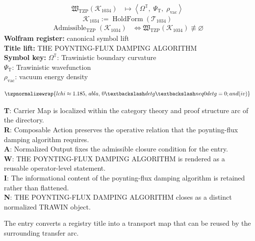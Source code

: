 \noindent
\begin{minipage}[t]{0.48\linewidth}
\begingroup
\small
\[
\begin{aligned}
\mathfrak{W}_{\mathrm{TZP}}\!\left(\mathcal{K}_{1034}\right)
&\longmapsto
\left\langle \Omega^{\mathbb{T}},\; \Psi_{\mathrm{T}},\; \rho_{\mathrm{vac}} \right\rangle
\end{aligned}
\]
\[
\mathcal{K}_{1034}
:=
\operatorname{HoldForm}\!\left(\mathcal{T}_{1034}\right)
\]
\[
\begin{aligned}
\operatorname{Admissible}_{\mathrm{TZP}}\!\left(\mathcal{K}_{1034}\right)
&\Longleftrightarrow
\mathfrak{W}_{\mathrm{TZP}}\!\left(\mathcal{K}_{1034}\right)\not\equiv\varnothing
\end{aligned}
\]
\textbf{Wolfram register:} canonical symbol lift\\
\textbf{Title lift:} THE POYNTING-FLUX DAMPING ALGORITHM\\
\textbf{Symbol key:} \(\Omega^{\mathbb{T}}\): Trawinistic boundary curvature\\ \(\Psi_{\mathrm{T}}\): Trawinistic wavefunction\\ \(\rho_{\mathrm{vac}}\): vacuum energy density
\par
\endgroup
\end{minipage}\hfill
\begin{minipage}[t]{0.48\linewidth}
\[
\tzpnormalizewrap{lchi\approx1.185,\,abla,\,0\textbackslash det g\textbackslash neq 0detg=0; and (iv)}
\]

\small
\textbf{T}: Carrier Map is localized within the category theory and proof structure arc of the directory.\\
\textbf{R}: Composable Action preserves the operative relation that the poynting-flux damping algorithm requires.\\
\textbf{A}: Normalized Output fixes the admissible closure condition for the entry.\\
\textbf{W}: THE POYNTING-FLUX DAMPING ALGORITHM is rendered as a reusable operator-level statement.\\
\textbf{I}: The informational content of the poynting-flux damping algorithm is retained rather than flattened.\\
\textbf{N}: THE POYNTING-FLUX DAMPING ALGORITHM closes as a distinct normalized TRAWIN object.
\normalsize
\end{minipage}

The entry converts a registry title into a transport map that can be reused by the surrounding transfer arc.
\clearpage

